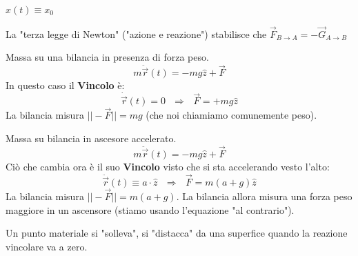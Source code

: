 \begin{example} \label{es-rez-vin-1}
    $x(t) \equiv x_0$ 
\end{example}
\hspace{-15pt}La "terza legge di Newton" ("azione e reazione") stabilisce che $\vec{F}_{B\to A} = -\vec{G}_{A \to B}$
\begin{example} \label{es-rez-vin-2}
    Massa su una bilancia in presenza di forza peso.
    $$m\ddot{\vec{r}}(t) = -mg\hat{z} + \vec{F}$$
    In questo caso il \textbf{Vincolo} è: 
    $$\dot{\vec{r}}(t) = 0 \:\:\:\Rightarrow\:\:\: \vec{F} = +mg\hat{z}$$ 
    La bilancia misura $||-\vec{F}|| = mg$ (che noi chiamiamo comunemente peso).
\end{example}
\begin{example} \label{es-rez-vin-3}
    Massa su bilancia in ascesore accelerato.
    $$m\ddot{\vec{r}}(t) = -mg\hat{z} + \vec{F}$$
    Ciò che cambia ora è il suo \textbf{Vincolo} visto che si sta accelerando vesto l'alto: 
    $$\ddot{\vec{r}}(t) \equiv a \cdot \hat{z} \:\:\:\Rightarrow\:\:\: \vec{F}= m(a+g)\hat{z}$$
    La bilancia misura $||-\vec{F}|| = m(a+g)$.
    La bilancia allora misura una forza peso maggiore in un ascensore (stiamo usando l'equazione "al contrario").
\end{example}
\begin{note}
    Un punto materiale si "solleva", si "distacca" da una superfice quando la reazione vincolare va a zero.
\end{note}
